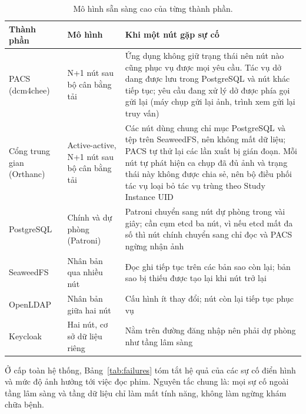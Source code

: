 \begin{table}[H]
\centering
\small
\begin{tabularx}{\textwidth}{@{}l p{3.4cm} Y@{}}
\toprule
\textbf{Thành phần} & \textbf{Mô hình} & \textbf{Khi một nút gặp sự cố} \\
\midrule
PACS (dcm4chee) & N+1 nút sau bộ cân bằng tải & Ứng dụng không giữ trạng thái nên nút nào cũng phục vụ được mọi yêu cầu. Tác vụ dở dang được lưu trong PostgreSQL và nút khác tiếp tục; yêu cầu đang xử lý dở được phía gọi gửi lại (máy chụp gửi lại ảnh, trình xem gửi lại truy vấn) \\
Cổng trung gian (Orthanc) & Active-active, N+1 nút sau bộ cân bằng tải & Các nút dùng chung chỉ mục PostgreSQL và tệp trên SeaweedFS, nên không mất dữ liệu; PACS tự thử lại các lần xuất bị gián đoạn. Mỗi nút tự phát hiện ca chụp đã đủ ảnh và trạng thái này không được chia sẻ, nên bộ điều phối tác vụ loại bỏ tác vụ trùng theo Study Instance UID \\
PostgreSQL & Chính và dự phòng (Patroni) & Patroni chuyển sang nút dự phòng trong vài giây; cần cụm etcd ba nút, vì nếu etcd mất đa số thì nút chính chuyển sang chỉ đọc và PACS ngừng nhận ảnh \\
SeaweedFS & Nhân bản qua nhiều nút & Đọc ghi tiếp tục trên các bản sao còn lại; bản sao bị thiếu được tạo lại khi nút trở lại \\
OpenLDAP & Nhân bản giữa hai nút & Cấu hình ít thay đổi; nút còn lại tiếp tục phục vụ \\
Keycloak & Hai nút, cơ sở dữ liệu riêng & Nằm trên đường đăng nhập nên phải dự phòng như tầng lâm sàng \\
\bottomrule
\end{tabularx}
\caption{Mô hình sẵn sàng cao của từng thành phần.}
\label{tab:ha}
\end{table}

Ở cấp toàn hệ thống, Bảng~\ref{tab:failures} tóm tắt hệ quả của các sự cố điển hình và
mức độ ảnh hưởng tới việc đọc phim. Nguyên tắc chung là: mọi sự cố ngoài tầng lâm sàng và
tầng dữ liệu chỉ làm mất tính năng, không làm ngừng khám chữa bệnh.

